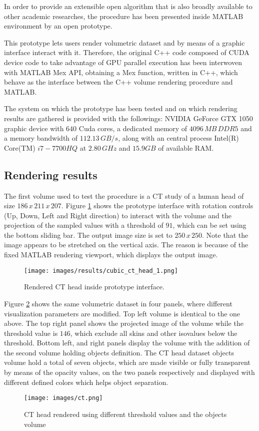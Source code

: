 \documentclass[12pt,a4paper]{extarticle}
\newcommand{\linespace}{\vspace{0pt}}
\begin{document}
In order to provide an extensible open algorithm that is also broadly available to other academic researches, the procedure has been presented inside MATLAB environment by an open prototype.

This prototype lets users render volumetric dataset and by means of a graphic interface interact with it. Therefore, the original C++ code composed of CUDA device code to take advantage of GPU parallel execution has been interwoven with MATLAB Mex API, obtaining a Mex function, written in C++, which behave as the interface between the C++ volume rendering procedure and MATLAB.
\linespace

The system on which the prototype has been tested and on which rendering results are gathered is provided with the followings: NVIDIA GeForce GTX 1050 graphic device with $640$ Cuda cores, a dedicated memory of $4096\,MB\,DDR5$ and a memory bandwidth of $112.13\,GB/s$, along with an central process Intel(R) Core(TM) $i7-7700HQ$ at $2.80\,GHz$ and $15.9GB$ of available RAM. 
\subsection{Rendering results} 
The first volume used to test the procedure is a CT study of a human head of size $186\,x\,211\,x\,207$. Figure \ref{fig:cubic_ct_head} shows the prototype interface with rotation controls (Up, Down, Left and Right direction) to interact with the volume and the projection of the sampled values with a threshold of $91$, which can be set using the bottom sliding bar. The output image size is set to $ 250\,x\,250$. Note that the image appears to be stretched on the vertical axis. The reason is because of the fixed MATLAB rendering viewport, which displays the output image.

\begin{figure}[hbtp]
\centering
\texttt{[image: images/results/cubic\_ct\_head\_1.png]}
\caption{Rendered CT head inside prototype interface.}
\label{fig:cubic_ct_head}
\end{figure}

\linespace

Figure \ref{fig:ct} shows the same volumetric dataset in four panels, where different visualization parameters are modified. Top left volume is identical to the one above. The top right panel shows the projected image of the volume while the threshold value is $146$, which exclude all skins and other isovalues below the threshold. Bottom left, and right panels display the volume with the addition of the second volume holding objects definition. The CT head dataset objects volume hold a total of seven objects, which are made visible or fully transparent by means of the opacity values, on the two panels respectively and displayed with different defined colors which helps object separation.
\begin{figure}[hbtp]
\centering
\texttt{[image: images/ct.png]}
\caption{CT head rendered using different threshold values and the objects volume}
\label{fig:ct}
\end{figure}
\end{document}
